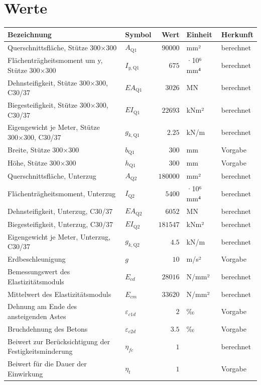 \documentclass[11pt,a4paper]{article}
\begin{document}
\section{Werte}
\begin{xltabular}{\linewidth}{>{\raggedright\arraybackslash}Xlrll}
\hline
Bezeichnung & Symbol & Wert & Einheit & Herkunft \\
\hline
\endhead
Querschnittsfläche, Stütze 300×300 & $A_{\text{Q1}}$ & $90000$ & mm² & berechnet \\
Flächenträgheitsmoment um y, Stütze 300×300 & $I_{y,\text{Q1}}$ & $675$ & ·10⁶ mm⁴ & berechnet \\
Dehnsteifigkeit, Stütze 300×300, C30/37 & $EA_{\text{Q1}}$ & $3026$ & MN & berechnet \\
Biegesteifigkeit, Stütze 300×300, C30/37 & $EI_{\text{Q1}}$ & $22693$ & kNm² & berechnet \\
Eigengewicht je Meter, Stütze 300×300, C30/37 & $g_{k,\text{Q1}}$ & $2.25$ & kN/m & berechnet \\
Breite, Stütze 300×300 & $b_{\text{Q1}}$ & $300$ & mm & Vorgabe \\
Höhe, Stütze 300×300 & $h_{\text{Q1}}$ & $300$ & mm & Vorgabe \\
Querschnittsfläche, Unterzug & $A_{\text{Q2}}$ & $180000$ & mm² & berechnet \\
Flächenträgheitsmoment, Unterzug & $I_{\text{Q2}}$ & $5400$ & ·10⁶ mm⁴ & berechnet \\
Dehnsteifigkeit, Unterzug, C30/37 & $EA_{\text{Q2}}$ & $6052$ & MN & berechnet \\
Biegesteifigkeit, Unterzug, C30/37 & $EI_{\text{Q2}}$ & $181547$ & kNm² & berechnet \\
Eigengewicht je Meter, Unterzug, C30/37 & $g_{k,\text{Q2}}$ & $4.5$ & kN/m & berechnet \\
Erdbeschleunigung & $g$ & $10$ & m/s² & Vorgabe \\
Bemessungswert des Elastizitätsmoduls & $E_{cd}$ & $28016$ & N/mm² & berechnet \\
Mittelwert des Elastizitätsmoduls & $E_{cm}$ & $33620$ & N/mm² & berechnet \\
Dehnung am Ende des ansteigenden Astes & $\varepsilon_{c1d}$ & $2$ & ‰ & Vorgabe \\
Bruchdehnung des Betons & $\varepsilon_{c2d}$ & $3.5$ & ‰ & Vorgabe \\
Beiwert zur Berücksichtigung der Festigkeitsminderung & $\eta_{fc}$ & $1$ &  & berechnet \\
Beiwert für die Dauer der Einwirkung & $\eta_t$ & $1$ &  & Vorgabe \\

\end{xltabular}
\end{document}

